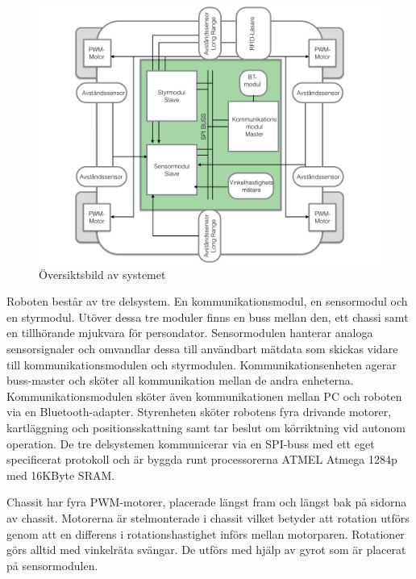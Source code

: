 \documentclass[a4paper,12pt,fleqn]{article}
\begin{document}
\begin{figure}[htp] %
  \begin{center}
  \includegraphics[keepaspectratio=true,width=\linewidth]{bilder/overview}  %
  \end{center}
  \caption{Översiktsbild av systemet} %
  \label{fig:overview}
\end{figure}

Roboten består av tre delsystem. En kommunikationsmodul, en sensormodul och en styrmodul. Utöver dessa tre moduler finns en buss mellan den, ett chassi samt en tillhörande mjukvara för persondator. Sensormodulen hanterar analoga sensorsignaler och omvandlar dessa till användbart mätdata som skickas vidare till kommunikationsmodulen och styrmodulen. 
Kommunikationsenheten agerar buss-master och sköter all kommunikation mellan de andra enheterna. Kommunikationsmodulen sköter även kommunikationen mellan PC och roboten via en Bluetooth-adapter. Styrenheten sköter robotens fyra drivande motorer, kartläggning och positionsskattning samt tar beslut om körriktning vid autonom operation. 
De tre delsystemen kommunicerar via en SPI-buss med ett eget specificerat protokoll och är byggda runt processorerna ATMEL Atmega 1284p med 16KByte SRAM. 

Chassit har fyra PWM-motorer, placerade längst fram och längst bak på sidorna av chassit. Motorerna är stelmonterade i chassit vilket betyder att rotation utförs genom att en differens i rotationshastighet införs mellan motorparen. Rotationer görs alltid med vinkelräta svängar. De utförs med hjälp av gyrot som är placerat på sensormodulen. 
\end{document}
